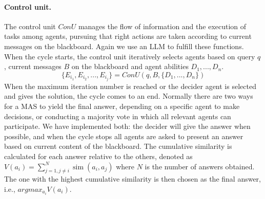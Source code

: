 \documentclass[11pt]{article}
\begin{document}
\paragraph{Control unit.}
The control unit $ConU$ manages the flow of information and the execution of tasks among agents, pursuing that right actions are taken according to current messages on the blackboard. Again we use an LLM to fulfill these functions. When the cycle starts, the control unit iteratively selects agents based on query $q$, current messages $B$ on the blackboard and agent abilities $D_1,...,D_n$.
\begin{equation}
\{E_{i_1},E_{i_2},...,E_{i_j} \} = ConU(q, B, \{D_1,...,D_n \})\label{cc}
\end{equation}
When the maximum iteration number is reached or the decider agent is selected and gives the solution, the cycle comes to an end. Normally there are two ways for a MAS to yield the final answer, depending on a specific agent to make decisions, or conducting a majority vote in which all relevant agents can participate. We have implemented both: the decider will give the answer when possible, and when the cycle stops all agents are asked to present an answer based on current content of the blackboard. The cumulative similarity is calculated for each answer relative to the others, denoted as $V\left(a_{i}\right)=\sum_{j=1, j \neq i}^{N} \operatorname{sim}\left(a_{i}, a_{j}\right)$ where $N$ is the number of answers obtained. The one with the highest cumulative similarity is then chosen as the final answer, i.e.,  $argmax_{a_i}V(a_i)$. 

\end{document}
